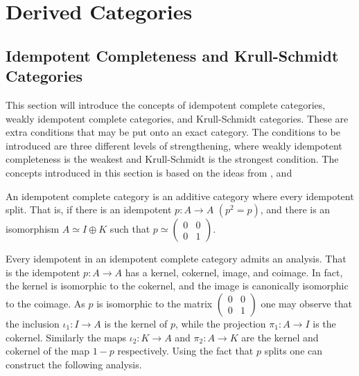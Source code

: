 \chapter{Derived Categories}

\section{Idempotent Completeness and Krull-Schmidt Categories}

    This section will introduce the concepts of idempotent complete categories, weakly idempotent complete categories, and Krull-Schmidt categories. These are extra conditions that may be put onto an exact category. The conditions to be introduced are three different levels of strengthening, where weakly idempotent completeness is the weakest and Krull-Schmidt is the strongest condition. The concepts introduced in this section is based on the ideas from \cite{buhler}, \cite{Kra12} and \cite{Rei95}

    \begin{definition}
        An idempotent complete category is an additive category where every idempotent split. That is, if there is an idempotent $p:A\rightarrow A$ $(p^2=p)$, and there is an isomorphism $A\simeq I\oplus K$ such that $p\simeq \begin{pmatrix} 0 & 0 \\ 0 & 1 \end{pmatrix}$. 
    \end{definition}

    Every idempotent in an idempotent complete category admits an analysis. That is the idempotent $p:A\rightarrow A$ has a kernel, cokernel, image, and coimage. In fact, the kernel is isomorphic to the cokernel, and the image is canonically isomorphic to the coimage. As $p$ is isomorphic to the matrix $\begin{pmatrix} 0 & 0 \\ 0 & 1 \end{pmatrix}$ one may observe that the inclusion $\iota_1:I\rightarrow A$ is the kernel of $p$, while the projection $\pi_1:A\rightarrow I$ is the cokernel. Similarly the maps $\iota_2:K\rightarrow A$ and $\pi_2:A\rightarrow K$ are the kernel and cokernel of the map $1-p$ respectively. Using the fact that $p$ splits one can construct the following analysis.

    \begin{center}
    \end{center}

